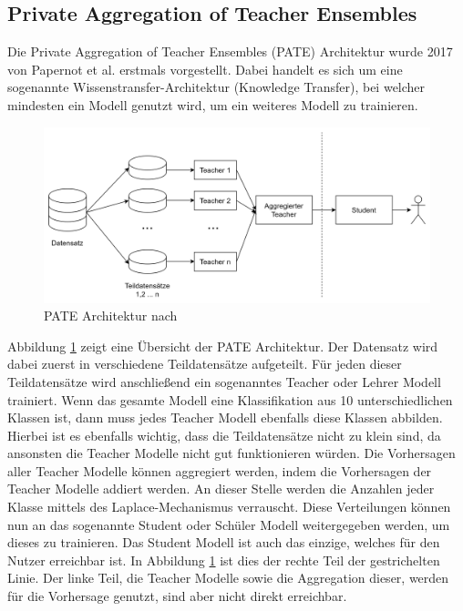 \subsection{Private Aggregation of Teacher Ensembles}\label{sec:pate}

Die Private Aggregation of Teacher Ensembles (PATE) Architektur wurde 2017 von Papernot et al. \cite{P-57} erstmals vorgestellt.
Dabei handelt es sich um eine sogenannte Wissenstransfer-Architektur (Knowledge Transfer), bei welcher mindesten ein Modell genutzt wird, um ein weiteres Modell zu trainieren.

\begin{figure}[!htb]
    \centering
    \includegraphics[width=15cm]{figures/pate_basic.png}
    \caption{PATE Architektur nach \cite{P-57}}
    \label{fig:pate_basic}
\end{figure} 

Abbildung \ref{fig:pate_basic} zeigt eine Übersicht der PATE Architektur.
Der Datensatz wird dabei zuerst in verschiedene Teildatensätze aufgeteilt. 
Für jeden dieser Teildatensätze wird anschließend ein sogenanntes Teacher oder Lehrer Modell trainiert.
Wenn das gesamte Modell eine Klassifikation aus 10 unterschiedlichen Klassen ist, dann muss jedes Teacher Modell ebenfalls diese Klassen abbilden.
Hierbei ist es ebenfalls wichtig, dass die Teildatensätze nicht zu klein sind, da ansonsten die Teacher Modelle nicht gut funktionieren würden.
Die Vorhersagen aller Teacher Modelle können aggregiert werden, indem die Vorhersagen der Teacher Modelle addiert werden. 
An dieser Stelle werden die Anzahlen jeder Klasse mittels des Laplace-Mechanismus verrauscht.
Diese Verteilungen können nun an das sogenannte Student oder Schüler Modell weitergegeben werden, um dieses zu trainieren.
Das Student Modell ist auch das einzige, welches für den Nutzer erreichbar ist.
In Abbildung \ref{fig:pate_basic} ist dies der rechte Teil der gestrichelten Linie.
Der linke Teil, die Teacher Modelle sowie die Aggregation dieser, werden für die Vorhersage genutzt, sind aber nicht direkt erreichbar.

